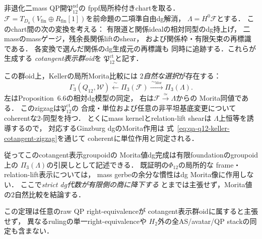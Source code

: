 \begin{theorem}
\label{thm:qa-q12-cotangent-keller-pseudonatural}
非退化二mass QP開$\mathfrak P_{12}^{\mathrm{nd}}$の
fppf局所枠付きchartを取る．
$\mathscr F=T_{D_0}(V_{\mathrm{fin}}\oplus
R_{\mathrm{fin}}[1])$を前命題の二項準自由dg解消，
$\Lambda=H^0\mathscr F$とする．
このchart間の次の変換を考える：
有限道と関係idealの相対同型のdg持上げ，
二massのmassゲージ，残余長関係liftのshear，
および関係枠・有限矢束の再標識である．
各変換で選んだ関係のdg生成元の再標識も
同時に追跡する．これらが生成する
\emph{cotangent表示群oid}を
$\mathfrak P_{12}^{\mathrm{ct}}$と記す．

この群oid上，Kellerの局所Morita比較には
\emph{$2$自然な選択}が存在する：
\[
 \Gamma_3(Q_{12},\mathcal W)
  \xleftarrow{\ \sim\ }
 \Pi_3(\mathscr F)
  \xrightarrow{\ \sim_{\mathrm{Mor}}\ }
 \Pi_3(\Lambda).
 \tag{KN}\label{eq:qa-q12-keller-cotangent-zigzag}
\]
左はProposition~6.6の相対dg模型の同定，
右は$\mathscr F\xrightarrow{\simeq}\Lambda$からの
Morita同値である．
このzigzagは$\mathfrak P_{12}^{\mathrm{ct}}$の
合成・単位および任意の非平坦基底変更について
coherentな$2$-同型を持つ．
とくにmass kernelとrelation-lift shearは
$\Lambda$上恒等を誘導するので，
対応するGinzburg dgのMorita作用は
式~\eqref{eq:qa-q12-keller-cotangent-zigzag}を通じて
coherentに単位作用と同定される．

従ってこのcotangent表示groupoidの
Morita値dg完成は有限foundationのgroupoid上の
$\Pi_3(\Lambda)$の引戻しとして記述できる．
既証明の$\Phi_{12}$の局所的な
frame・relation-lift表示については，
mass gerbeの余分な慣性はdg Morita像に作用しない．
ここで\emph{strict dg代数が有限側の商に降下する}
とまでは主張せず，Morita値の$2$自然比較を結論する．

この定理は任意のraw QP right-equivalenceが
cotangent表示群oidに属すると主張せず，
異なるrulingの単一right-equivalenceや
$H_2$外の全AS/avatar/QP stackの同定も含まない．
\end{theorem}
